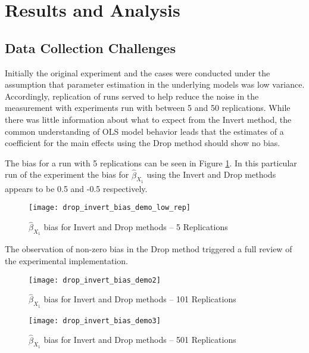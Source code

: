 \documentclass[../paper.tex]{subfiles}
\begin{document}
\section{Results and Analysis}

\subsection{Data Collection Challenges}
Initially the original experiment and the cases were conducted under the assumption that parameter estimation in the underlying models was low variance.
Accordingly, replication of runs served to help reduce the noise in the measurement with experiments run with between 5 and 50 replications.
While there was little information about what to expect from the Invert method, the common understanding of OLS model behavior leads that the estimates of a coefficient for the main effects using the Drop method should show no bias.

The bias for a run with 5 replications can be seen in Figure \ref{fig:drop_invert_bias_demo_low_rep}. In this particular run of the experiment the bias for $\hat{\beta}_{X_{1}}$ using the Invert and Drop methods appears to be 0.5 and -0.5 respectively.

\begin{figure}[H]

\centering
\texttt{[image: drop\_invert\_bias\_demo\_low\_rep]}
\caption{$\hat{\beta}_{X_{1}}$ bias  for Invert and Drop methods -- 5 Replications}
\label{fig:drop_invert_bias_demo_low_rep}
\end{figure}


The observation of non-zero bias in the Drop method triggered a full review of the experimental implementation.

\begin{figure}[H]

\centering
\texttt{[image: drop\_invert\_bias\_demo2]}
\caption{$\hat{\beta}_{X_{1}}$ bias for Invert and Drop methods -- 101 Replications}
\label{fig:drop_invert_bias_demo2}
\end{figure}

\begin{figure}[H]

\centering
\texttt{[image: drop\_invert\_bias\_demo3]}
\caption{$\hat{\beta}_{X_{1}}$  bias for Invert and Drop methods -- 501 Replications}
\label{fig:drop_invert_bias_demo3}
\end{figure}
\end{document}
